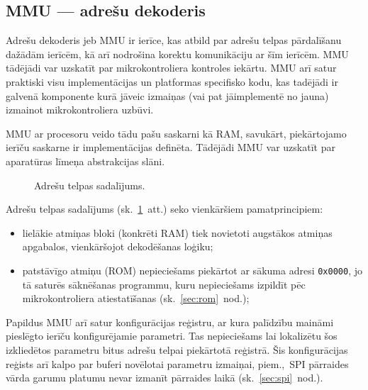 

\subsection{MMU — adrešu dekoderis} \label{sec:mmu}
	Adrešu dekoderis jeb MMU ir ierīce, kas atbild par adrešu telpas
	pārdalīšanu dažādām ierīcēm, kā arī nodrošina korektu komunikāciju
	ar šīm ierīcēm. MMU tādējādi var uzskatīt par mikrokontroliera kontroles
	iekārtu. MMU arī satur praktiski visu implementācijas un platformas
	specifisko kodu, kas tadējādi ir galvenā komponente kurā jāveic izmaiņas
	(vai pat jāimplementē no jauna) izmainot mikrokontroliera uzbūvi.
	
	MMU ar procesoru veido tādu pašu saskarni kā RAM,
	savukārt, piekārtojamo ierīču saskarne ir implementācijas definēta.
	Tādējādi MMU var uzskatīt par aparatūras līmeņa abstrakcijas slāni.
	
	\begin{figure}[thp]
		\centering
		\def\svgwidth{0.9\textwidth}
		{\ttfamily\small}
		\caption{Adrešu telpas sadalījums.}
		\label{fig:memory-map}
	\end{figure}
	
	Adrešu telpas sadalījums (sk.~\ref{fig:memory-map}~att.) seko vienkāršiem pamatprincipiem:
	\begin{itemize}
		\item lielākie atmiņas bloki (konkrēti RAM) tiek novietoti augstākos
			atmiņas apgabalos, vienkāršojot dekodēšanas loģiku;
		\item patstāvīgo atmiņu (ROM) nepieciešams piekārtot ar sākuma
			adresi \texttt{0x0000}, jo tā saturēs sāknēšanas programmu,
			kuru nepieciešams izpildīt pēc mikrokontroliera atiestatīšanas
			(sk.~\ref{sec:rom}~nod.);
	\end{itemize}
	
	Papildus MMU arī satur konfigurācijas reģistru,
	ar kura palīdzību maināmi pieslēgto ierīču konfigurējamie parametri.
	Tas nepieciešams lai lokalizētu šos izkliedētos parametru bitus
	adrešu telpai piekārtotā reģistrā. Šis konfigurācijas reģists arī kalpo
	par buferi novēlotai parametru izmaiņai, piem.,~SPI pārraides vārda garumu
	platumu nevar izmanīt pārraides laikā (sk.~\ref{sec:spi}~nod.).
	


